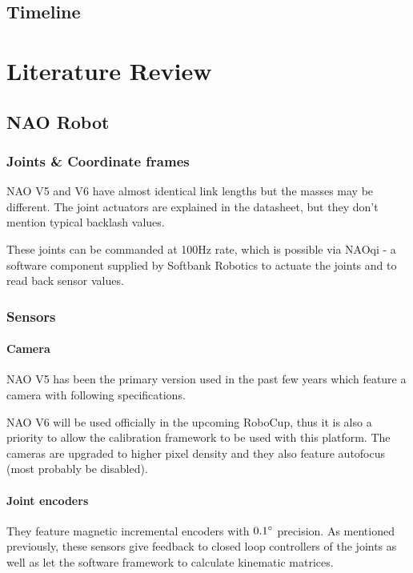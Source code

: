 \documentclass[english, printversion, nomenclature, notitle]{tuvisionthesis} %
\begin{document}
\section{Timeline}

\chapter{Literature Review}

\section{NAO Robot}

\subsection{Joints \& Coordinate frames}
NAO V5 and V6 have almost identical link lengths but the masses may be different. The joint actuators are explained in the datasheet, but they don't mention typical backlash values. 

These joints can be commanded at 100Hz rate, which is possible via NAOqi - a software component supplied by Softbank Robotics to actuate the joints and to read back sensor values.

\subsection{Sensors}
\subsubsection{Camera}
NAO V5 has been the primary version used in the past few years which feature a camera with following specifications.

NAO V6 will be used officially in the upcoming RoboCup, thus it is also a priority to allow the calibration framework to be used with this platform. The cameras are upgraded to higher pixel density and they also feature autofocus (most probably be disabled).

\subsubsection{Joint encoders}

They feature magnetic incremental encoders with $0.1\degree$ precision. As mentioned previously, these sensors give feedback to closed loop controllers of the joints as well as let the software framework to calculate kinematic matrices. 
\end{document}
